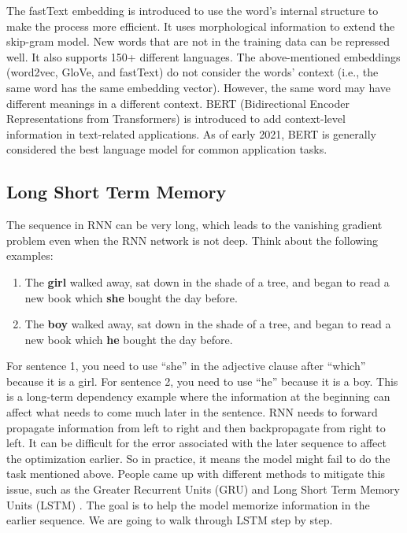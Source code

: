 \documentclass[12pt,]{krantz}
\providecommand{\tightlist}{%
  \setlength{\itemsep}{0pt}\setlength{\parskip}{0pt}}
\begin{document}
The fastText embedding is introduced to use the word's internal structure to make the process more efficient. It uses morphological information to extend the skip-gram model. New words that are not in the training data can be repressed well. It also supports 150+ different languages. The above-mentioned embeddings (word2vec, GloVe, and fastText) do not consider the words' context (i.e., the same word has the same embedding vector). However, the same word may have different meanings in a different context. BERT (Bidirectional Encoder Representations from Transformers) is introduced to add context-level information in text-related applications. As of early 2021, BERT is generally considered the best language model for common application tasks.

\hypertarget{lstm}{%
\subsection{Long Short Term Memory}\label{lstm}}

The sequence in RNN can be very long, which leads to the vanishing gradient problem even when the RNN network is not deep. Think about the following examples:

\begin{enumerate}
\def\labelenumi{\arabic{enumi}.}
\tightlist
\item
  The \textbf{girl} walked away, sat down in the shade of a tree, and began to read a new book which \textbf{she} bought the day before.
\item
  The \textbf{boy} walked away, sat down in the shade of a tree, and began to read a new book which \textbf{he} bought the day before.
\end{enumerate}

For sentence 1, you need to use ``she'' in the adjective clause after ``which'' because it is a girl. For sentence 2, you need to use ``he'' because it is a boy. This is a long-term dependency example where the information at the beginning can affect what needs to come much later in the sentence. RNN needs to forward propagate information from left to right and then backpropagate from right to left. It can be difficult for the error associated with the later sequence to affect the optimization earlier. So in practice, it means the model might fail to do the task mentioned above. People came up with different methods to mitigate this issue, such as the Greater Recurrent Units (GRU) \citep{chung2014empirical} and Long Short Term Memory Units (LSTM) \citep{lstm1997}. The goal is to help the model memorize information in the earlier sequence. We are going to walk through LSTM step by step.
\end{document}
